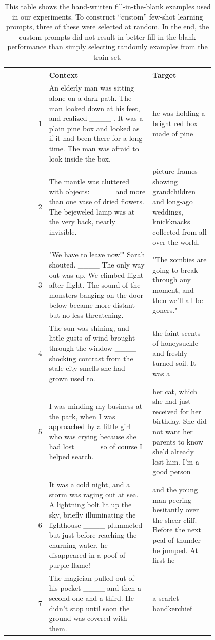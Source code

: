 \begin{table}
    \centering
    \small
    \caption{This table shows the hand-written fill-in-the-blank examples used in our experiments.
     To construct ``custom'' few-shot learning prompts, three of these were selected at random.
    In the end, the custom prompts did not result in better fill-in-the-blank performance than simply selecting randomly examples from the train set.
    }
    \label{tab:custom_examples}
    \begin{tabular}{r|p{0.5\linewidth}|p{0.3\linewidth}}
         \toprule
         & \textbf{Context} & \textbf{Target} \\
         \midrule
1 & An elderly man was sitting alone on a dark path. The man looked down at his feet, and realized \_\_\_\_ . It was a plain pine box and looked as if it had been there for a long time. The man was afraid to look inside the box. & he was holding a bright red box made of pine \\
\arrayrulecolor{lg} \midrule \arrayrulecolor{black}
2 & The mantle was cluttered with objects: \_\_\_\_ and more than one vase of dried flowers. The bejeweled lamp was at the very back, nearly invisible. & picture frames showing grandchildren and long-ago weddings, knickknacks collected from all over the world, \\
\arrayrulecolor{lg} \midrule \arrayrulecolor{black}
3 & "We have to leave now!" Sarah shouted. \_\_\_\_ The only way out was up. We climbed flight after flight. The sound of the monsters banging on the door below became more distant but no less threatening. & "The zombies are going to break through any moment, and then we'll all be goners." \\
\arrayrulecolor{lg} \midrule \arrayrulecolor{black}
4 & The sun was shining, and little gusts of wind brought through the window \_\_\_\_ shocking contrast from the stale city smells she had grown used to. & the faint scents of honeysuckle and freshly turned soil. It was a \\
\arrayrulecolor{lg} \midrule \arrayrulecolor{black}
5 & I was minding my business at the park, when I was approached by a little girl who was crying because she had lost \_\_\_\_ so of course I helped search. & her cat, which she had just received for her birthday. She did not want her parents to know she'd already lost him. I'm a good person \\
\arrayrulecolor{lg} \midrule \arrayrulecolor{black}
6 & It was a cold night, and a storm was raging out at sea. A lightning bolt lit up the sky, briefly illuminating the lighthouse \_\_\_\_ plummeted but just before reaching the churning water, he disappeared in a poof of purple flame! & and the young man peering hesitantly over the sheer cliff. Before the next peal of thunder he jumped. At first he  \\
\arrayrulecolor{lg} \midrule \arrayrulecolor{black}
7 & The magician pulled out of his pocket \_\_\_\_ and then a second one and a third. He didn't stop until soon the ground was covered with them. & a scarlet handkerchief  \\
         \bottomrule
    \end{tabular}
\end{table}

